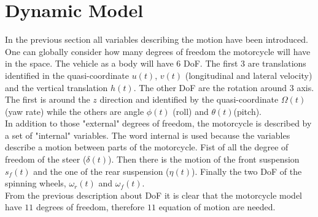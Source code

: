 \section{Dynamic Model}
%
In the previous section all variables describing the motion have been introduced. One can globally consider how many degrees of freedom the motorcycle will have in the space. The vehicle as a body will have 6 DoF. The first 3 are translations identified in the quasi-coordinate $u(t)$, $v(t)$ (longitudinal and lateral velocity) and the vertical translation $h(t)$. The other DoF are the rotation around 3 axis. The first is around the $z$ direction and identified by the quasi-coordinate $\Omega(t)$ (yaw rate) while the others are angle $\phi(t)$ (roll) and $\theta(t)$(pitch).\\
In addition to those "external" degrees of freedom, the motorcycle is described by a set of "internal" variables. The word internal is used because the variables describe a motion between parts of the motorcycle. Fist of all the degree of freedom of the steer ($\delta(t)$). Then there is the motion of the front suspension $s_f(t)$ and the one of the rear suspension ($\eta(t)$). Finally the two DoF of the spinning wheels, $\omega_r(t)$ and $\omega_f(t)$.\\
From the previous description about DoF it is clear that the motorcycle model have $11$ degrees of freedom, therefore $11$ equation of motion are needed.
%

